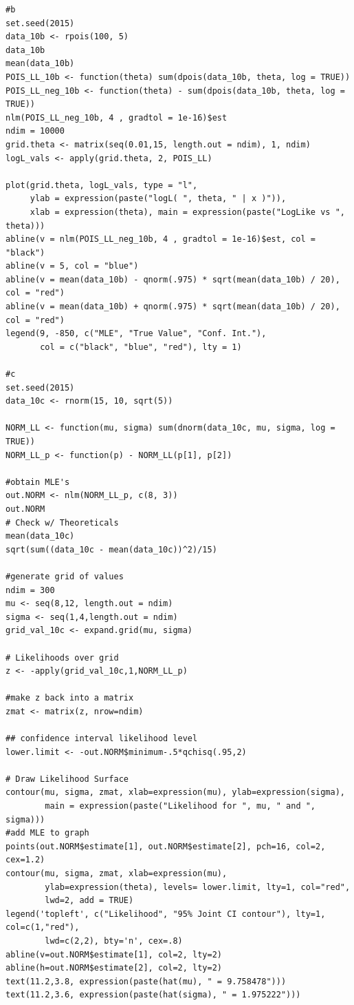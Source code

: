 \documentclass[12pt]{article}\usepackage[]{graphicx}\usepackage[]{color}
\begin{document}
\begin{verbatim}
#b
set.seed(2015)
data_10b <- rpois(100, 5)
data_10b
mean(data_10b)
POIS_LL_10b <- function(theta) sum(dpois(data_10b, theta, log = TRUE))
POIS_LL_neg_10b <- function(theta) - sum(dpois(data_10b, theta, log = TRUE))
nlm(POIS_LL_neg_10b, 4 , gradtol = 1e-16)$est
ndim = 10000
grid.theta <- matrix(seq(0.01,15, length.out = ndim), 1, ndim)
logL_vals <- apply(grid.theta, 2, POIS_LL)

plot(grid.theta, logL_vals, type = "l", 
     ylab = expression(paste("logL( ", theta, " | x )")),
     xlab = expression(theta), main = expression(paste("LogLike vs ", theta)))
abline(v = nlm(POIS_LL_neg_10b, 4 , gradtol = 1e-16)$est, col = "black")
abline(v = 5, col = "blue")
abline(v = mean(data_10b) - qnorm(.975) * sqrt(mean(data_10b) / 20), col = "red")
abline(v = mean(data_10b) + qnorm(.975) * sqrt(mean(data_10b) / 20), col = "red")
legend(9, -850, c("MLE", "True Value", "Conf. Int."), 
       col = c("black", "blue", "red"), lty = 1)

#c
set.seed(2015)
data_10c <- rnorm(15, 10, sqrt(5))

NORM_LL <- function(mu, sigma) sum(dnorm(data_10c, mu, sigma, log = TRUE))
NORM_LL_p <- function(p) - NORM_LL(p[1], p[2])

#obtain MLE's
out.NORM <- nlm(NORM_LL_p, c(8, 3))
out.NORM
# Check w/ Theoreticals
mean(data_10c)
sqrt(sum((data_10c - mean(data_10c))^2)/15)

#generate grid of values
ndim = 300
mu <- seq(8,12, length.out = ndim)
sigma <- seq(1,4,length.out = ndim)
grid_val_10c <- expand.grid(mu, sigma)

# Likelihoods over grid
z <- -apply(grid_val_10c,1,NORM_LL_p)

#make z back into a matrix
zmat <- matrix(z, nrow=ndim)

## confidence interval likelihood level
lower.limit <- -out.NORM$minimum-.5*qchisq(.95,2)

# Draw Likelihood Surface
contour(mu, sigma, zmat, xlab=expression(mu), ylab=expression(sigma),
        main = expression(paste("Likelihood for ", mu, " and ", sigma)))
#add MLE to graph
points(out.NORM$estimate[1], out.NORM$estimate[2], pch=16, col=2, cex=1.2)
contour(mu, sigma, zmat, xlab=expression(mu), 
        ylab=expression(theta), levels= lower.limit, lty=1, col="red", 
        lwd=2, add = TRUE)
legend('topleft', c("Likelihood", "95% Joint CI contour"), lty=1, col=c(1,"red"),
        lwd=c(2,2), bty='n', cex=.8)
abline(v=out.NORM$estimate[1], col=2, lty=2)
abline(h=out.NORM$estimate[2], col=2, lty=2)
text(11.2,3.8, expression(paste(hat(mu), " = 9.758478")))
text(11.2,3.6, expression(paste(hat(sigma), " = 1.975222")))


\end{verbatim}
\end{document}
